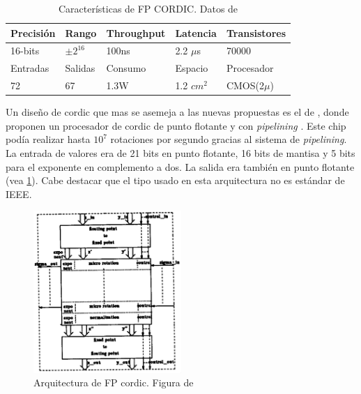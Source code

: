 \begin{table}[]
	\centering
	\begin{tabular}{|l|l|l|l|l|}
	\hline
		Precisión & Rango                 & Throughput & Latencia                  & Transistores \\ \hline
		16-bits   & $\pm2^{16}$ & 100ns      & 2.2 $\mu$s                     & 70000        \\
\hline
		Entradas  & Salidas               & Consumo    & Espacio                   & Procesador   \\ \hline
		72        & 67                    & 1.3W       & 1.2 $cm^2$ & CMOS(2$\mu$) \\ \hline   
	\end{tabular}
	\caption{Características de FP CORDIC. Datos de \cite{de_lange_optimal_1988}}
	\label{table:FP_CORDIC_feature}
\end{table}

Un diseño de \gls{cordic} que mas se asemeja a las nuevas propuestas es el de \cite{de_lange_optimal_1988}, donde proponen un procesador de \gls{cordic} de punto flotante y con \textit{pipelining} . Este chip podía realizar hasta $10^7$ rotaciones por segundo gracias al sistema de \textit{pipelining}. La entrada de valores era de 21 bits en punto flotante, 16 bits de mantisa y 5 bits para el exponente en complemento a dos. La salida era también en punto flotante (vea \ref{graf:Arq_FP_CORDIC}). Cabe destacar que el tipo usado en esta arquitectura no es estándar de IEEE.

\begin{figure}[ht]
	\centering
	\includegraphics[width=0.5\textwidth]{archivos/CORDIC/1988_FP_CORDIC_Architecture.png}
	\caption{Arquitectura de FP \gls{cordic}. Figura de \cite{de_lange_optimal_1988}}
	\label{graf:Arq_FP_CORDIC}
\end{figure}

